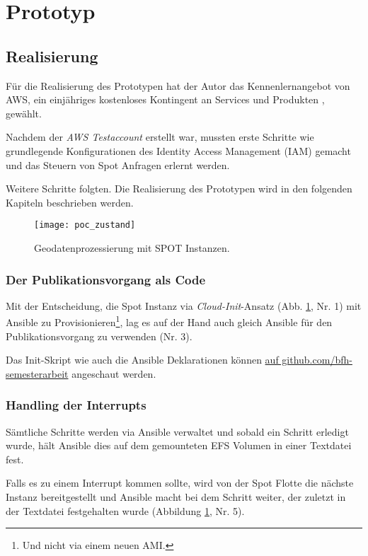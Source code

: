 \section{Prototyp}
\subsection{Realisierung}
Für die Realisierung des Prototypen hat der Autor das Kennenlernangebot von AWS, ein einjähriges kostenloses Kontingent an Services und Produkten \cite{FreeTier2020}, gewählt. 

Nachdem der \emph{AWS Testaccount} erstellt war, mussten erste Schritte wie grundlegende Konfigurationen des Identity Access Management (IAM) gemacht und das Steuern von Spot Anfragen erlernt werden.

Weitere Schritte folgten. Die Realisierung des Prototypen wird in den folgenden Kapiteln beschrieben werden.

\begin{figure}[H]
	\centering
	\texttt{[image: poc\_zustand]}
	\caption{Geodatenprozessierung mit SPOT Instanzen.}
	\label{fig:ist_zustand}
\end{figure}

\subsubsection{Der Publikationsvorgang als Code}
Mit der Entscheidung, die Spot Instanz via \emph{Cloud-Init}-Ansatz (Abb. \ref{fig:ist_zustand}, Nr. 1) mit Ansible zu Provisionieren\footnote{Und nicht via einem neuen AMI.}, lag es auf der Hand auch gleich Ansible für den Publikationsvorgang zu verwenden (Nr. 3).

Das Init-Skript wie auch die Ansible Deklarationen können \href{https://github.com/bfh-semesterarbeit/up-and-running-dataprocessing}{auf github.com/bfh-semesterarbeit} angeschaut werden.




\subsubsection{Handling der Interrupts}
Sämtliche Schritte werden via Ansible verwaltet und sobald ein Schritt erledigt wurde, hält Ansible dies auf dem gemounteten EFS Volumen in einer Textdatei fest.

Falls es zu einem Interrupt kommen sollte, wird von der Spot Flotte die nächste Instanz bereitgestellt und Ansible macht bei dem Schritt weiter, der zuletzt in der Textdatei festgehalten wurde (Abbildung \ref{fig:ist_zustand}, Nr. 5).


